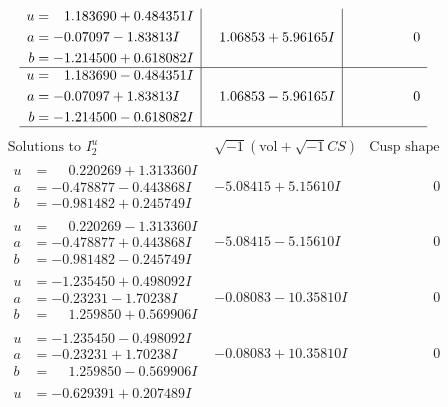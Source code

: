 \documentclass[1p]{elsarticle_modified}
\theoremstyle{definition}
\newcommand{\I}{\sqrt{-1}}
\begin{document}
$$\begin{array}{c|c|c}
\begin{aligned}
u &= \phantom{-}1.183690 + 0.484351 I \\
a &= -0.07097 - 1.83813 I \\
b &= -1.214500 + 0.618082 I\end{aligned}
 & \phantom{-}1.06853 + 5.96165 I & \phantom{-0.000000 } 0 \\ \hline\begin{aligned}
u &= \phantom{-}1.183690 - 0.484351 I \\
a &= -0.07097 + 1.83813 I \\
b &= -1.214500 - 0.618082 I\end{aligned}
 & \phantom{-}1.06853 - 5.96165 I & \phantom{-0.000000 } 0\\
 \hline 
 \end{array}$$\newpage$$\begin{array}{c|c|c}  
\text{Solutions to }I^u_{2}& \I (\text{vol} + \sqrt{-1}CS) & \text{Cusp shape}\\
 \hline 
\begin{aligned}
u &= \phantom{-}0.220269 + 1.313360 I \\
a &= -0.478877 - 0.443868 I \\
b &= -0.981482 + 0.245749 I\end{aligned}
 & -5.08415 + 5.15610 I & \phantom{-0.000000 } 0 \\ \hline\begin{aligned}
u &= \phantom{-}0.220269 - 1.313360 I \\
a &= -0.478877 + 0.443868 I \\
b &= -0.981482 - 0.245749 I\end{aligned}
 & -5.08415 - 5.15610 I & \phantom{-0.000000 } 0 \\ \hline\begin{aligned}
u &= -1.235450 + 0.498092 I \\
a &= -0.23231 - 1.70238 I \\
b &= \phantom{-}1.259850 + 0.569906 I\end{aligned}
 & -0.08083 - 10.35810 I & \phantom{-0.000000 } 0 \\ \hline\begin{aligned}
u &= -1.235450 - 0.498092 I \\
a &= -0.23231 + 1.70238 I \\
b &= \phantom{-}1.259850 - 0.569906 I\end{aligned}
 & -0.08083 + 10.35810 I & \phantom{-0.000000 } 0 \\ \hline\begin{aligned}
u &= -0.629391 + 0.207489 I \\

\end{aligned}
\end{array}$$
\end{document}
